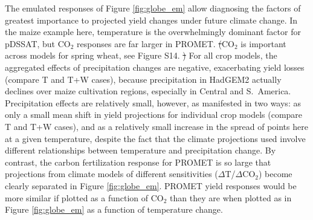 \documentclass[gmdd]{copernicus} %
\providecommand{\DIFadd}[1]{{\protect\color{blue}\uwave{#1}}} %
\providecommand{\DIFdel}[1]{{\protect\color{red}\sout{#1}}}                      %
\providecommand{\DIFaddbegin}{} %
\providecommand{\DIFaddend}{} %
\providecommand{\DIFdelbegin}{} %
\providecommand{\DIFdelend}{} %
\begin{document}
\DIFdelend The emulated responses of Figure \ref{fig:globe_em} allow diagnosing the factors of greatest importance to projected yield changes under future climate change. In the maize example here, temperature is the overwhelmingly dominant factor for pDSSAT, but CO$_2$ responses are far larger in PROMET. \DIFdelbegin \DIFdel{(}\DIFdelend CO$_2$ is important across models for spring wheat, see Figure S14. \DIFdelbegin \DIFdel{) }\DIFdelend For all crop models, the aggregated effects of precipitation changes are negative, exacerbating yield losses (compare T and T+W cases), because precipitation in HadGEM2 actually declines over maize cultivation regions, especially in Central and S.\ America. Precipitation effects are relatively small, however, as manifested in two ways: as only a small mean shift in yield projections for individual crop models (compare T and T+W cases), and as a relatively small increase in the spread of points here at a given temperature, despite the fact that the climate projections used involve different relationships between temperature and precipitation change.  By contrast, the carbon \DIFaddbegin \DIFadd{dioxide }\DIFaddend fertilization response for PROMET is so large that projections from climate models of different sensitivities ($\Delta$T/$\Delta$CO$_2$) become clearly separated in Figure \ref{fig:globe_em}. PROMET yield responses would be more similar if plotted as a function of CO$_2$ than they are when plotted as in Figure \ref{fig:globe_em} as a function of temperature change. 
\end{document}
